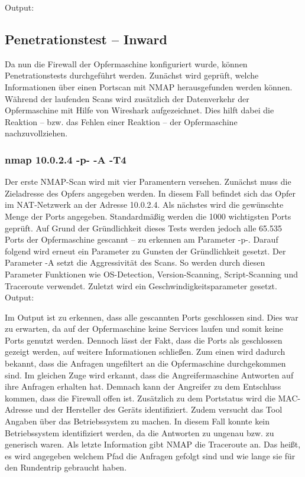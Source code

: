 \newpage



\newpage
Output: 


\subsection{Penetrationstest – Inward}
Da nun die Firewall der Opfermaschine konfiguriert wurde, können Penetrationstests durchgeführt werden. 
Zunächst wird geprüft, welche Informationen über einen Portscan mit NMAP herausgefunden werden können. 
Während der laufenden Scans wird zusätzlich der Datenverkehr der Opfermaschine mit Hilfe von Wireshark aufgezeichnet. 
Dies hilft dabei die Reaktion – bzw. das Fehlen einer Reaktion – der Opfermaschine nachzuvollziehen.
\subsubsection{nmap 10.0.2.4 -p- -A -T4}
Der erste NMAP-Scan wird mit vier Paramentern versehen. Zunächst muss die Zieladresse des Opfers angegeben werden. In diesem Fall befindet sich das Opfer im NAT-Netzwerk an der Adresse 10.0.2.4. Als nächstes wird die gewünschte Menge der Ports angegeben. Standardmäßig werden die 1000 wichtigsten Ports geprüft. Auf Grund der Gründlichkeit dieses Tests werden jedoch alle 65.535 Ports der Opfermaschine gescannt – zu erkennen am Parameter -p-. Darauf folgend wird erneut ein Parameter zu Gunsten der Gründlichkeit gesetzt. Der Parameter -A setzt die Aggressivität des Scans. So werden durch diesen Parameter Funktionen wie OS-Detection, Version-Scanning, Script-Scanning und Traceroute verwendet. Zuletzt wird ein Geschwindigkeitsparameter gesetzt. \\

Output:


Im Output ist zu erkennen, dass alle gescannten Ports geschlossen sind. Dies war zu erwarten, da auf der Opfermaschine keine Services laufen und somit keine Ports genutzt werden. Dennoch lässt der Fakt, dass die Ports als geschlossen gezeigt werden, auf weitere Informationen schließen. Zum einen wird dadurch bekannt, dass die Anfragen ungefiltert an die Opfermaschine durchgekommen sind. Im gleichen Zuge wird erkannt, dass die Angreifermaschine Antworten auf ihre Anfragen erhalten hat. Demnach kann der Angreifer zu dem Entschluss kommen, dass die Firewall offen ist. 
Zusätzlich zu dem Portstatus wird die MAC-Adresse und der Hersteller des Geräts identifiziert. Zudem versucht das Tool Angaben über das Betriebssystem zu machen. In diesem Fall konnte kein Betriebssystem identifiziert werden, da die Antworten zu ungenau bzw. zu generisch waren. Als letzte Information gibt NMAP die Traceroute an. Das heißt, es wird angegeben welchem Pfad die Anfragen gefolgt sind und wie lange sie für den Rundentrip gebraucht haben.

